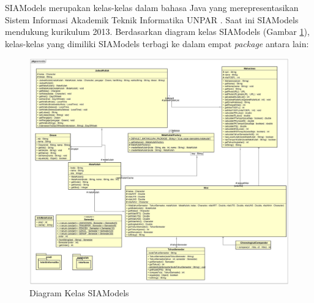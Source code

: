 SIAModels merupakan kelas-kelas dalam bahasa Java yang merepresentasikan Sistem Informasi Akademik Teknik Informatika UNPAR \cite{siamodels}. Saat ini SIAModels mendukung kurikulum 2013. Berdasarkan diagram kelas SIAModels (Gambar \ref{fig:2_siamodels_class}), kelas-kelas yang dimiliki SIAModels terbagi ke dalam empat \textit{package} antara lain:

\begin{figure}[H]
\centering
\includegraphics[scale=0.35]{Gambar/class-diagram-siamodels}
\caption{Diagram Kelas SIAModels}
\label{fig:2_siamodels_class}
\end{figure}


